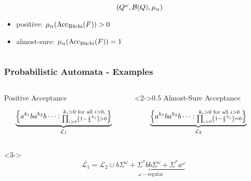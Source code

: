 \documentclass{beamer}
\begin{document}
\begin{frame}
\begin{overlayarea}{\textwidth}{0.7\textheight}
\begin{onlyenv}
\begin{columns}
\begin{column}{0.5\textwidth}
\begin{itemize}
\begin{equation*}
                  \left(Q^{\omega}, \mathcal{B}(Q), \mu_{\alpha}\right)
                \end{equation*}
              \item<5-> positive: $\mu_{\alpha}(\operatorname{Acc}_{\operatorname{B\ddot{u}chi}}(F)) > 0$
              \item<6-> almost-sure: $\mu_{\alpha}(\operatorname{Acc}_{\operatorname{B\ddot{u}chi}}(F)) = 1$
            \end{itemize}
          \end{column}
        \end{columns}
      \end{onlyenv}
    \end{overlayarea}
  \end{frame}

  \begin{frame}
    \frametitle{Probabilistic Automata - Examples}
    \begin{columns}
      \begin{column}{0.5\textwidth}
        \small{Positive Acceptance}
        \begin{center}
        \end{center}
        \begin{equation*}
          \underbrace{
              \left\{a^{k_{1}}ba^{k_{2}}b\dots:
              \substack{k_{i}>0\text{ for all }i>0,\\
              \prod_{i>0}\left(1-\frac{1}{2}^{k_{i}}\right) > 0}
            \right\}
          }_{\mathcal{L}_{1}}
        \end{equation*}
      \end{column}
      \begin{column}<2->{0.5\textwidth}
        \small{Almost-Sure Acceptance}
        \begin{center}
        \end{center}
        \begin{equation*}
          \underbrace{
            \left\{
              a^{k_{1}}ba^{k_{2}}b\dots:
              \substack{k_{i}>0\text{ for all }i>0\\
              \prod_{i>0}\left(1-\frac{1}{2}^{k_{i}}\right) = 0}
            \right\}
          }_{\mathcal{L}_{2}}
        \end{equation*}
      \end{column}
    \end{columns}
    \begin{uncoverenv}<3->
      \begin{equation*}
        \overline{\mathcal{L}_{1}} = \mathcal{L}_{2}\cup\underbrace{
          b\Sigma^{\omega} + \Sigma^{*}bb\Sigma^{\omega} + \Sigma^{*}a^{\omega}
        }_{\omega-\text{regular}}
      \end{equation*}
    \end{uncoverenv}
  \end{frame}
\end{document}
